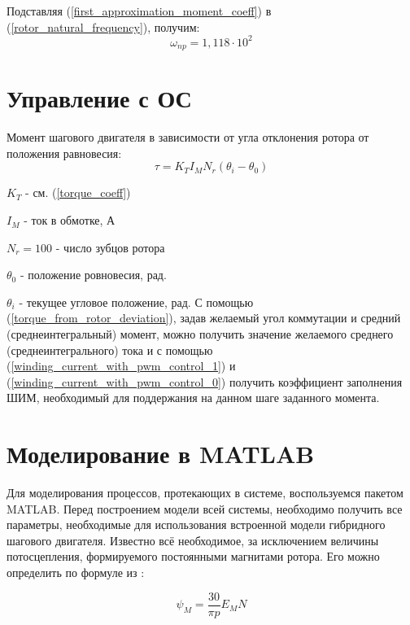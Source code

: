 Подставляя (\ref{first_approximation_moment_coeff}) в (\ref{rotor_natural_frequency}), получим:
\begin{equation}
    \label{first_approximation_rotor_natural_frequency}
    \omega_{np} = 1,118 \cdot 10^{2}
\end{equation}

\newpage
\part{ Управление с ОС }

Момент шагового двигателя в зависимости от угла отклонения ротора от положения равновесия:
\begin{equation}
    \label{torque_from_rotor_deviation}
    \tau = K_{T} I_{M} N_{r} ( \theta_{i} - \theta_{0} )
\end{equation}

$K_{T}$ - см. (\ref{torque_coeff})

$I_{M}$ - ток в обмотке, А

$N_{r} = 100$ - число зубцов ротора

$\theta_{0}$ - положение ровновесия, рад.

$\theta_{i}$ - текущее угловое положение, рад.
\newline\newline
С помощью (\ref{torque_from_rotor_deviation}), задав желаемый угол коммутации и средний (среднеинтегральный) момент, можно получить значение желаемого среднего (среднеинтегрального) тока и с помощью (\ref{winding_current_with_pwm_control_1}) и (\ref{winding_current_with_pwm_control_0}) получить коэффициент заполнения ШИМ, необходимый для поддержания на данном шаге заданного момента.

\newpage
\part{ Моделирование в MATLAB }
Для моделирования процессов, протекающих в системе, воспользуемся пакетом MATLAB. Перед построением модели всей системы, необходимо получить все параметры, необходимые для использования встроенной модели гибридного шагового двигателя. Известно всё необходимое, за исключением величины потосцепления, формируемого постоянными магнитами ротора. Его можно определить по формуле из \cite{Matlab_help_stepper_motor}:

\begin{equation}
    \label{maximum_flux_linkage}
    \psi_{M} = \frac{30}{\pi p} E_{M} N
\end{equation}

